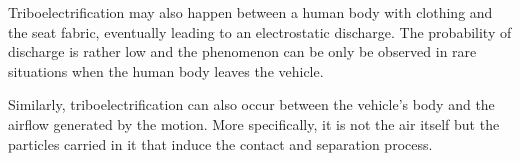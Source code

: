 Triboelectrification may also happen between a human body with clothing and the seat fabric, eventually leading to an electrostatic discharge.
The probability of discharge is rather low \cite{generationESDautomotive} and the phenomenon can be only be observed in rare situations when the human body leaves the vehicle.

Similarly, triboelectrification can also occur between the vehicle's body and the airflow generated by the motion.
More specifically, it is not the air itself but the particles carried in it that induce the contact and separation process.
